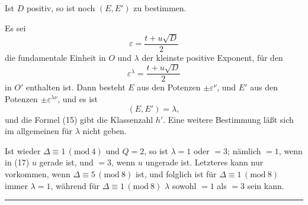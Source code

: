 Ist $D$ positiv, so ist noch $(E, E')$ zu bestimmen.

Es sei
\[
\varepsilon = \frac{t + u\sqrt{D}}{2}
\]
die fundamentale Einheit in $O$ und $\lambda$ der kleinste positive Exponent, f\"ur den
\[\varepsilon^{\lambda} = \frac{t + u\sqrt{D}}{2}\]
in $O'$ enthalten ist. Dann besteht $E$ aus den Potenzen $\pm \varepsilon^{\nu}$, und $E'$ aus den Potenzen $\pm \varepsilon^{\lambda\nu}$, und es ist
\[
(E, E') = \lambda,
\]
und die Formel (15) gibt die Klassenzahl $h'$. Eine weitere Bestimmung l\"a\ss t sich im allgemeinen f\"ur $\lambda$ nicht geben.

Ist wieder $\Delta \equiv 1 \, (\mathrm{mod}\ 4)$ und $Q = 2$, so ist $\lambda = 1$ oder $= 3$; n\"amlich $= 1$, wenn in (17) $u$ gerade ist, und $= 3$, wenn $u$ ungerade ist. Letzteres kann nur vorkommen, wenn $\Delta \equiv 5 \, (\mathrm{mod}\ 8)$ ist, und folglich ist f\"ur $\Delta \equiv 1 \, (\mathrm{mod}\ 8)$ immer $\lambda = 1$, w\"ahrend f\"ur $\Delta \equiv 1 \, (\mathrm{mod}\ 8)$ %
$\lambda$ sowohl $= 1$ als $= 3$ sein kann.

\begin{center}\rule{0.32\linewidth}{0.4pt}\end{center}
